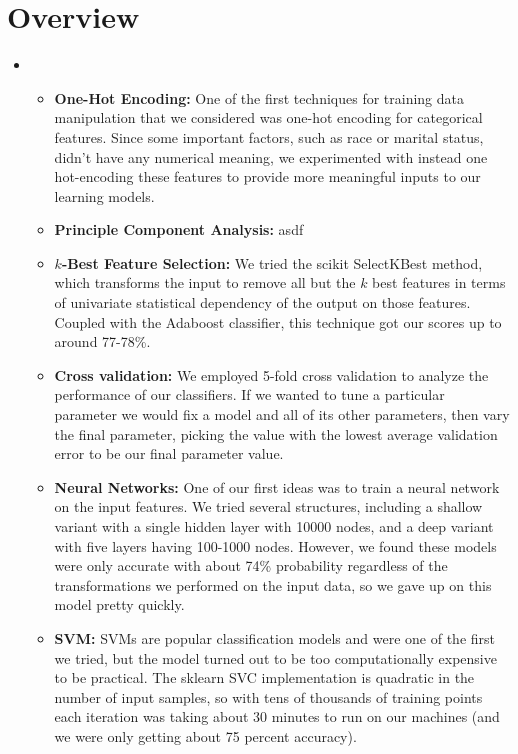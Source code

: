 \section{Overview}
\medskip
\begin{itemize}

    \item {}
    \begin{itemize}
    \item \textbf{One-Hot Encoding:} One of the first techniques for training data manipulation that we considered was one-hot encoding for categorical features. Since some important factors, such as race or marital status, didn't have any numerical meaning, we experimented with instead one hot-encoding these features to provide more meaningful inputs to our learning models.
    \item \textbf{Principle Component Analysis:} asdf
     \item \textbf{$k$-Best Feature Selection:} We tried the scikit SelectKBest method, which transforms the input to remove all but the $k$ best features in terms of univariate statistical dependency of the output on those features. Coupled with the Adaboost classifier, this technique got our scores up to around 77-78\%.
     \item \textbf{Cross validation:} We employed 5-fold cross validation to analyze the performance of our classifiers. If we wanted to tune a particular parameter we would fix a model and all of its other parameters, then vary the final parameter, picking the value with the lowest average validation error to be our final parameter value. 
    \item \textbf{Neural Networks:} One of our first ideas was to train a neural network on the input features. We tried several structures, including a shallow variant with a single hidden layer with 10000 nodes, and a deep variant with five layers having 100-1000 nodes. However, we found these models were only accurate with about 74\% probability regardless of the transformations we performed on the input data, so we gave up on this model pretty quickly. 
    \item \textbf{SVM:} SVMs are popular classification models and were one of the first we tried, but the model turned out to be too computationally expensive to be practical. The sklearn SVC implementation is quadratic in the number of input samples, so with tens of thousands of training points each iteration was taking about 30 minutes to run on our machines (and we were only getting about 75 percent accuracy).

\end{itemize}
\end{itemize}
